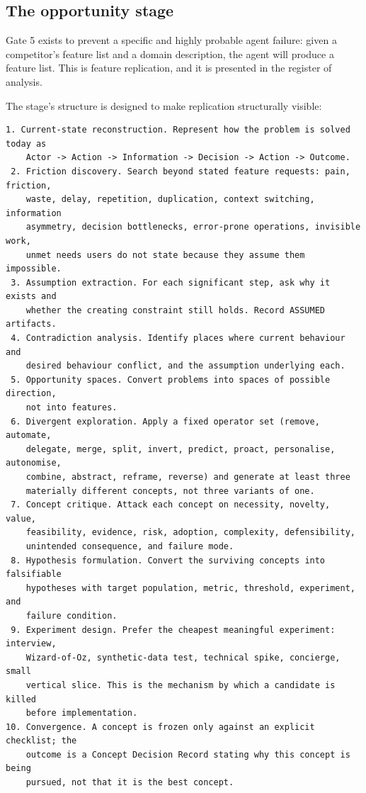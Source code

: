 \documentclass[11pt,a4paper]{article}
\begin{document}
\subsection{The opportunity stage}

Gate 5 exists to prevent a specific and highly probable agent failure: given a competitor's feature list and a domain description, the agent will produce a feature list. This is feature replication, and it is presented in the register of analysis.

The stage's structure is designed to make replication structurally visible:

\begin{Verbatim}[fontsize=\footnotesize,breaklines=true,breakanywhere=true,breakautoindent=false,samepage=false]
 1. Current-state reconstruction. Represent how the problem is solved today as
    Actor -> Action -> Information -> Decision -> Action -> Outcome.
 2. Friction discovery. Search beyond stated feature requests: pain, friction,
    waste, delay, repetition, duplication, context switching, information
    asymmetry, decision bottlenecks, error-prone operations, invisible work,
    unmet needs users do not state because they assume them impossible.
 3. Assumption extraction. For each significant step, ask why it exists and
    whether the creating constraint still holds. Record ASSUMED artifacts.
 4. Contradiction analysis. Identify places where current behaviour and
    desired behaviour conflict, and the assumption underlying each.
 5. Opportunity spaces. Convert problems into spaces of possible direction,
    not into features.
 6. Divergent exploration. Apply a fixed operator set (remove, automate,
    delegate, merge, split, invert, predict, proact, personalise, autonomise,
    combine, abstract, reframe, reverse) and generate at least three
    materially different concepts, not three variants of one.
 7. Concept critique. Attack each concept on necessity, novelty, value,
    feasibility, evidence, risk, adoption, complexity, defensibility,
    unintended consequence, and failure mode.
 8. Hypothesis formulation. Convert the surviving concepts into falsifiable
    hypotheses with target population, metric, threshold, experiment, and
    failure condition.
 9. Experiment design. Prefer the cheapest meaningful experiment: interview,
    Wizard-of-Oz, synthetic-data test, technical spike, concierge, small
    vertical slice. This is the mechanism by which a candidate is killed
    before implementation.
10. Convergence. A concept is frozen only against an explicit checklist; the
    outcome is a Concept Decision Record stating why this concept is being
    pursued, not that it is the best concept.
\end{Verbatim}
\end{document}
